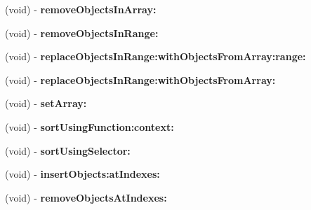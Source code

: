 \begin{DoxyCompactItemize}
\item 
\hypertarget{interfaceget_open_orders_by_g_l_n_response_adc2424480a77b456907d93fe43f90bc5}{}(void) -\/ {\bfseries remove\+Objects\+In\+Array\+:}\label{interfaceget_open_orders_by_g_l_n_response_adc2424480a77b456907d93fe43f90bc5}

\item 
\hypertarget{interfaceget_open_orders_by_g_l_n_response_a3fca89296e92c896141cbdf1579a9fe0}{}(void) -\/ {\bfseries remove\+Objects\+In\+Range\+:}\label{interfaceget_open_orders_by_g_l_n_response_a3fca89296e92c896141cbdf1579a9fe0}

\item 
\hypertarget{interfaceget_open_orders_by_g_l_n_response_a04d5f9c178f89ba9e3c2e3a015a406ca}{}(void) -\/ {\bfseries replace\+Objects\+In\+Range\+:with\+Objects\+From\+Array\+:range\+:}\label{interfaceget_open_orders_by_g_l_n_response_a04d5f9c178f89ba9e3c2e3a015a406ca}

\item 
\hypertarget{interfaceget_open_orders_by_g_l_n_response_a2aed9260f0baaae8265c20b71e6cd03a}{}(void) -\/ {\bfseries replace\+Objects\+In\+Range\+:with\+Objects\+From\+Array\+:}\label{interfaceget_open_orders_by_g_l_n_response_a2aed9260f0baaae8265c20b71e6cd03a}

\item 
\hypertarget{interfaceget_open_orders_by_g_l_n_response_a78ffe8bf767c45d27296ce70cf924509}{}(void) -\/ {\bfseries set\+Array\+:}\label{interfaceget_open_orders_by_g_l_n_response_a78ffe8bf767c45d27296ce70cf924509}

\item 
\hypertarget{interfaceget_open_orders_by_g_l_n_response_a9efa75c2eebd5d09ebe0aa503185e3bb}{}(void) -\/ {\bfseries sort\+Using\+Function\+:context\+:}\label{interfaceget_open_orders_by_g_l_n_response_a9efa75c2eebd5d09ebe0aa503185e3bb}

\item 
\hypertarget{interfaceget_open_orders_by_g_l_n_response_a23ba8149e05e0f978b8a2b6dfb1e5aa3}{}(void) -\/ {\bfseries sort\+Using\+Selector\+:}\label{interfaceget_open_orders_by_g_l_n_response_a23ba8149e05e0f978b8a2b6dfb1e5aa3}

\item 
\hypertarget{interfaceget_open_orders_by_g_l_n_response_a364aaad61139e6e9a3e15f9290c3485c}{}(void) -\/ {\bfseries insert\+Objects\+:at\+Indexes\+:}\label{interfaceget_open_orders_by_g_l_n_response_a364aaad61139e6e9a3e15f9290c3485c}

\item 
\hypertarget{interfaceget_open_orders_by_g_l_n_response_af4a809341246092a0ed86bb29f143795}{}(void) -\/ {\bfseries remove\+Objects\+At\+Indexes\+:}\label{interfaceget_open_orders_by_g_l_n_response_af4a809341246092a0ed86bb29f143795}


\end{DoxyCompactItemize}

